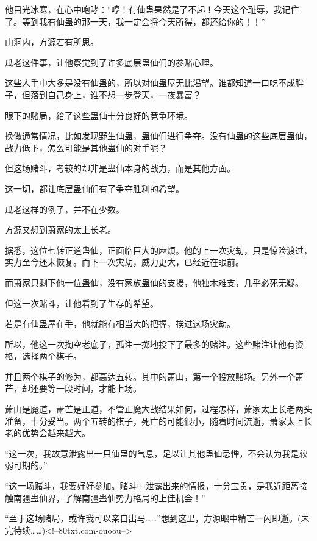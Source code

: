 \begin{this_body}
他目光冰寒，在心中咆哮：“哼！有仙蛊果然是了不起！今天这个耻辱，我记住了。等到我有仙蛊的那一天，我一定会将今天所得，都还给你的！！”

山洞内，方源若有所思。

瓜老这件事，让他察觉到了许多底层蛊仙们的参赌心理。

这些人手中大多是没有仙蛊的，所以对仙蛊屋无比渴望。谁都知道一口吃不成胖子，但落到自己身上，谁不想一步登天，一夜暴富？

眼下的赌局，给了这些蛊仙十分良好的竞争环境。

换做通常情况，比如发现野生仙蛊，蛊仙们进行争夺。没有仙蛊的这些底层蛊仙，战力低下，怎么可能是其他蛊仙的对手呢？

但这场赌斗，考较的却非是蛊仙本身的战力，而是其他方面。

这一切，都让底层蛊仙们有了争夺胜利的希望。

瓜老这样的例子，并不在少数。

方源又想到萧家的太上长老。

据悉，这位七转正道蛊仙，正面临巨大的麻烦。他的上一次灾劫，只是惊险渡过，实力至今还未恢复。而下一次灾劫，威力更大，已经近在眼前。

而萧家只剩下他一位蛊仙，没有家族蛊仙的支援，他独木难支，几乎必死无疑。

但这一次赌斗，让他看到了生存的希望。

若是有仙蛊屋在手，他就能有相当大的把握，挨过这场灾劫。

所以，他这一次掏空老底子，孤注一掷地投下了最多的赌注。这些赌注让他有资格，选择两个棋子。

并且两个棋子的修为，都高达五转。其中的萧山，第一个投放赌场。另外一个萧芒，却还要等一段时间，才能上场。

萧山是魔道，萧芒是正道，不管正魔大战结果如何，过程怎样，萧家太上长老两头准备，十分妥当。两个五转的棋子，死亡的可能很小，随着时间流逝，萧家太上长老的优势会越来越大。

“这一次，我故意泄露出一只仙蛊的气息，足以让其他蛊仙忌惮，不会认为我是软弱可期的。”

“这一场赌斗，我要好好参加。赌斗中泄露出来的情报，十分宝贵，是我近距离接触南疆蛊仙界，了解南疆蛊仙势力格局的上佳机会！”

“至于这场赌局，或许我可以亲自出马……”想到这里，方源眼中精芒一闪即逝。(未完待续……)<!--80txt.com-ouoou-->

\end{this_body}


